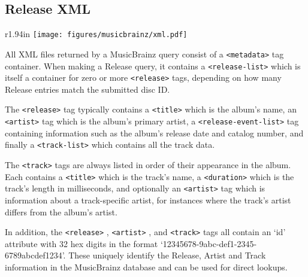 \subsection{Release XML}
\begin{wrapfigure}[21]{r}{1.94in}
\texttt{[image: figures/musicbrainz/xml.pdf]}
\end{wrapfigure}
All XML files returned by a MusicBrainz query consist of a
\texttt{<metadata>}
tag container.
When making a Release query, it contains a
\texttt{<release-list>}
which is itself a container for zero or more
\texttt{<release>}
tags, depending on how many Release entries match the submitted
disc ID.

The
\texttt{<release>}
tag typically contains a
\texttt{<title>}
which is the album's name,
an
\texttt{<artist>}
tag which is the album's primary artist,
a
\texttt{<release-event-list>}
tag containing information such as the album's
release date and catalog number,
and finally a
\texttt{<track-list>}
which contains all the track data.

The
\texttt{<track>}
tags are always listed in order of their appearance in the album.
Each contains a
\texttt{<title>}
which is the track's name,
a
\texttt{<duration>}
which is the track's length in milliseconds,
and optionally an
\texttt{<artist>}
tag which is information about a track-specific artist,
for instances where the track's artist differs from the album's artist.

In addition, the
\texttt{<release>}
,
\texttt{<artist>}
,
and
\texttt{<track>}
tags all contain an `id' attribute with 32 hex digits in the format
`12345678-9abc-def1-2345-6789abcdef1234'.
These uniquely identify the Release, Artist and Track information
in the MusicBrainz database and can be used for direct lookups.

